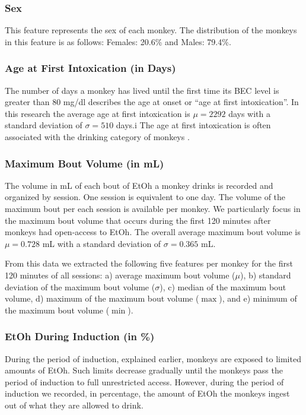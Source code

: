 \documentclass{bmcart}
\begin{document}
\subsubsection*{Sex}
This feature represents the sex of each monkey. The distribution of the monkeys
in this feature is as follows: Females: 20.6\% and Males: 79.4\%.

\subsubsection*{Age at First Intoxication (in Days)}
The number of days a monkey has lived until the first time its BEC level is
greater than 80 mg/dl describes the age at onset or ``age at first
intoxication''. In this research the average age at first intoxication is $\mu =
2292$ days with a standard deviation of $\sigma = 510$ days.i The age at first
intoxication is often associated with the drinking category of monkeys
\cite{alex2015}.

\subsubsection*{Maximum Bout Volume (in mL)}
The volume in mL of each bout of EtOh a monkey drinks is recorded and organized
by session. One session is equivalent to one day. The volume of the maximum
bout per each session is available per monkey. We particularly focus in the
maximum bout volume that occurs during the first 120 minutes after monkeys had
open-access to EtOh. The overall average maximum bout volume is $\mu =
0.728$ mL with a standard deviation of $\sigma = 0.365$ mL.

From this data we extracted the following five features per monkey for the
first 120 minutes of all sessions: 
a) average maximum bout volume ($\mu$), b) standard deviation of the maximum bout 
volume ($\sigma$), c) median of the maximum bout volume, d) maximum of the maximum bout
volume ($\max$), and e) minimum of the maximum bout volume ($\min$).

\subsubsection*{EtOh During Induction (in \%)}
During the period of induction, explained earlier, monkeys are exposed to
limited amounts of EtOh. Such limits decrease gradually until the monkeys pass
the period of induction to full unrestricted access. However, during the period
of induction we recorded, in percentage, the amount of EtOh the monkeys ingest
out of what they are allowed to drink.
\end{document}
